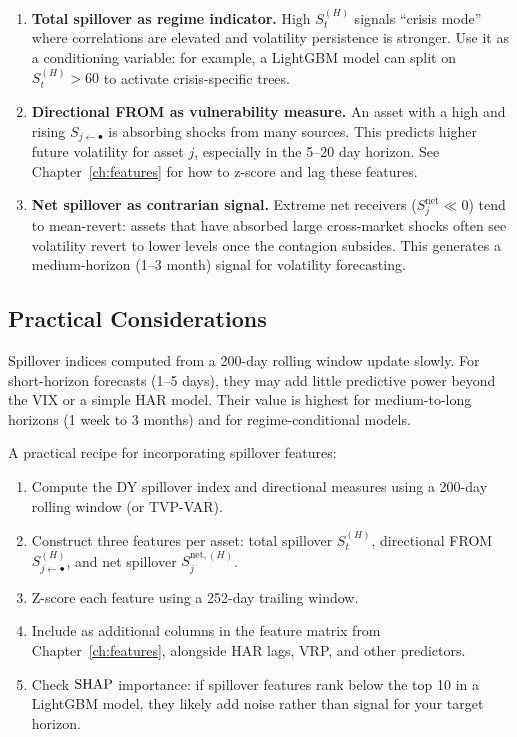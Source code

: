 \begin{keyidea}
\begin{enumerate}[nosep]
  \item \textbf{Total spillover as regime indicator.}
        High $S^{(H)}_t$ signals ``crisis mode'' where correlations are elevated and
        volatility persistence is stronger.  Use it as a conditioning variable: for
        example, a LightGBM model can split on $S^{(H)}_t > 60$ to activate
        crisis-specific trees.

  \item \textbf{Directional FROM as vulnerability measure.}
        An asset with a high and rising $S_{j \leftarrow \bullet}$ is absorbing
        shocks from many sources.  This predicts higher future volatility for asset
        $j$, especially in the 5--20 day horizon.  See Chapter~\ref{ch:features}
        for how to z-score and lag these features.

  \item \textbf{Net spillover as contrarian signal.}
        Extreme net receivers ($S_j^{\text{net}} \ll 0$) tend to mean-revert:
        assets that have absorbed large cross-market shocks often see volatility
        revert to lower levels once the contagion subsides.  This generates a
        medium-horizon (1--3 month) signal for volatility forecasting.
\end{enumerate}
\end{keyidea}

\subsection{Practical Considerations}

\begin{warning}
Spillover indices computed from a 200-day rolling window update slowly.  For
short-horizon forecasts (1--5 days), they may add little predictive power beyond
the VIX or a simple HAR model.  Their value is highest for medium-to-long horizons
(1 week to 3 months) and for regime-conditional models.
\end{warning}

A practical recipe for incorporating spillover features:
\begin{enumerate}[nosep]
  \item Compute the DY spillover index and directional measures using a 200-day
        rolling window (or TVP-VAR).
  \item Construct three features per asset: total spillover $S^{(H)}_t$, directional
        FROM $S_{j \leftarrow \bullet}^{(H)}$, and net spillover
        $S_j^{\text{net},(H)}$.
  \item Z-score each feature using a 252-day trailing window.
  \item Include as additional columns in the feature matrix from
        Chapter~\ref{ch:features}, alongside HAR lags, VRP, and other predictors.
  \item Check $\operatorname{SHAP}$ importance: if spillover features rank below the top 10 in a
        LightGBM model, they likely add noise rather than signal for your target
        horizon.
\end{enumerate}

